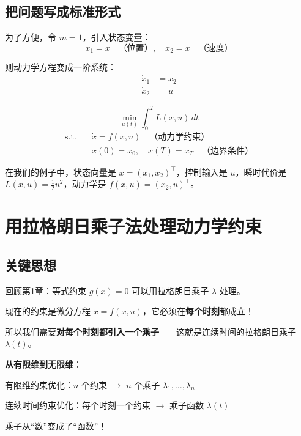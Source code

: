 \subsection{把问题写成标准形式}

为了方便，令 $m=1$，引入状态变量：
\[
x_1 = x \quad \text{（位置）}, \quad x_2 = \dot{x} \quad \text{（速度）}
\]

则动力学方程变成一阶系统：
\begin{align}
\dot{x}_1 &= x_2 \\
\dot{x}_2 &= u
\end{align}

\begin{keyformula}[title=轨迹优化的标准形式]
\begin{equation}
\min_{u(t)} \int_0^T L(x, u) \, dt
\end{equation}
\begin{align}
\text{s.t.} \quad & \dot{x} = f(x, u) \quad \text{（动力学约束）} \\
& x(0) = x_0, \quad x(T) = x_T \quad \text{（边界条件）}
\end{align}

在我们的例子中，状态向量是 $x = (x_1, x_2)^\top$，控制输入是 $u$，瞬时代价是 $L(x, u) = \frac{1}{2}u^2$，动力学是 $f(x, u) = (x_2, u)^\top$。
\end{keyformula}

\section{用拉格朗日乘子法处理动力学约束}

\subsection{关键思想}

回顾第1章：等式约束 $g(x) = 0$ 可以用拉格朗日乘子 $\lambda$ 处理。

现在的约束是微分方程 $\dot{x} = f(x, u)$，它必须在\textbf{每个时刻}都成立！

所以我们需要\textbf{对每个时刻都引入一个乘子}——这就是连续时间的拉格朗日乘子 $\lambda(t)$。

\begin{insightbox}
\textbf{从有限维到无限维}：

有限维约束优化：$n$ 个约束 $\to$ $n$ 个乘子 $\lambda_1, \ldots, \lambda_n$

连续时间约束优化：每个时刻一个约束 $\to$ 乘子函数 $\lambda(t)$

乘子从“数”变成了“函数”！
\end{insightbox}

